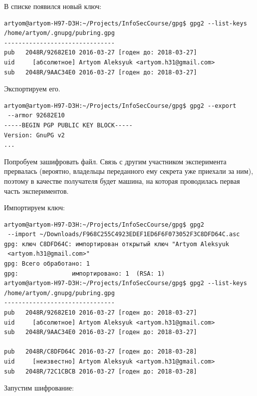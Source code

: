 В списке появился новый ключ:

\begin{verbatim}
artyom@artyom-H97-D3H:~/Projects/InfoSecCourse/gpg$ gpg2 --list-keys
/home/artyom/.gnupg/pubring.gpg
-------------------------------
pub   2048R/92682E10 2016-03-27 [годен до: 2018-03-27]
uid     [абсолютное] Artyom Aleksyuk <artyom.h31@gmail.com>
sub   2048R/9AAC34E0 2016-03-27 [годен до: 2018-03-27]
\end{verbatim}

Экспортируем его.

\begin{verbatim}
artyom@artyom-H97-D3H:~/Projects/InfoSecCourse/gpg$ gpg2 --export
 --armor 92682E10
-----BEGIN PGP PUBLIC KEY BLOCK-----
Version: GnuPG v2
...
\end{verbatim}

Попробуем зашифровать файл. Связь с другим участником эксперимента прервалась (вероятно, владельцы переданного ему секрета уже приехали за ним), поэтому в качестве получателя будет машина, на которая проводилась первая часть экспериментов.

Импортируем ключ:

\begin{verbatim}  
artyom@artyom-H97-D3H:~/Projects/InfoSecCourse/gpg$ gpg2
 --import ~/Downloads/F968C255C4923EDEF1ED6F6F073052F3C8DFD64C.asc 
gpg: ключ C8DFD64C: импортирован открытый ключ "Artyom Aleksyuk
 <artyom.h31@gmail.com>"
gpg: Всего обработано: 1
gpg:               импортировано: 1  (RSA: 1)
artyom@artyom-H97-D3H:~/Projects/InfoSecCourse/gpg$ gpg2 --list-keys
/home/artyom/.gnupg/pubring.gpg
-------------------------------
pub   2048R/92682E10 2016-03-27 [годен до: 2018-03-27]
uid     [абсолютное] Artyom Aleksyuk <artyom.h31@gmail.com>
sub   2048R/9AAC34E0 2016-03-27 [годен до: 2018-03-27]

pub   2048R/C8DFD64C 2016-03-27 [годен до: 2018-03-28]
uid     [неизвестно] Artyom Aleksyuk <artyom.h31@gmail.com>
sub   2048R/72C1CBCB 2016-03-27 [годен до: 2018-03-28]
\end{verbatim}

Запустим шифрование:

